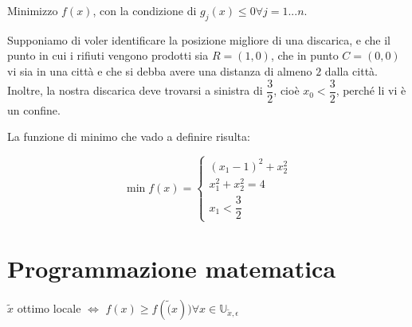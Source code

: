 \documentclass[\main/main.tex]{subfiles}
\begin{document}
Minimizzo $f(x)$, con la condizione di $g_j(x) \leq 0 \forall j = 1...n $.

Supponiamo di voler identificare la posizione migliore di una discarica, e che il punto in cui i rifiuti vengono prodotti sia $R = (1,0)$, che in punto $C = (0,0)$ vi sia in una città e che si debba avere una distanza di almeno $2$ dalla città. Inoltre, la nostra discarica deve trovarsi a sinistra di $\dfrac{3}{2}$, cioè $x_0 < \dfrac{3}{2}$, perché li vi è un confine.

\begin{center}
\end{center}

La funzione di minimo che vado a definire risulta:

\[
	\min f(x) = \begin{cases}
		(x_1-1)^2 + x_2^2 \\
		x_1^2 + x_2^2 = 4 \\
		x_1  < \dfrac{3}{2}
	\end{cases}
\]

\begin{figure}
\end{figure}


\section{Programmazione matematica}

\begin{definition}
	$\widetilde{x}$ ottimo locale $\Leftrightarrow$ $f(x) \geq f(\widetilde(x)) \forall x \in \mathbb{U}_{\widetilde{x}, \epsilon}$
\end{definition}
\end{document}

